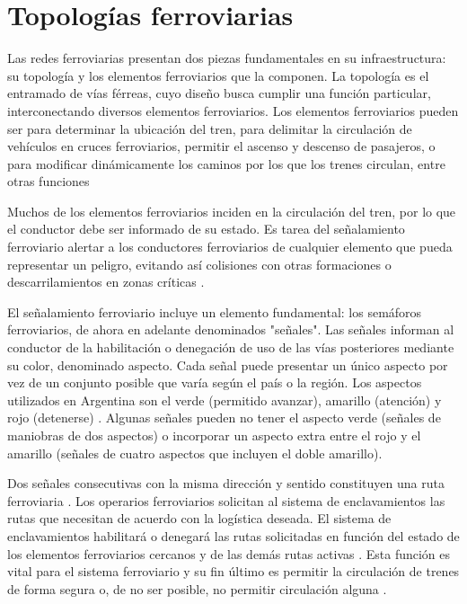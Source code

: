 \section{Topologías ferroviarias}
    \label{sec:topologias}
    Las redes ferroviarias presentan dos piezas fundamentales en su infraestructura: su topología y los elementos ferroviarios que la componen. La topología es el entramado de vías férreas, cuyo diseño busca cumplir una función particular, interconectando diversos elementos ferroviarios. Los elementos ferroviarios pueden ser para determinar la ubicación del tren, para delimitar la circulación de vehículos en cruces ferroviarios, permitir el ascenso y descenso de pasajeros, o para modificar dinámicamente los caminos por los que los trenes circulan, entre otras funciones \cite{Paper_4,Paper_13,Paper_17,Paper_175}

    Muchos de los elementos ferroviarios inciden en la circulación del tren, por lo que el conductor debe ser informado de su estado. Es tarea del señalamiento ferroviario alertar a los conductores ferroviarios de cualquier elemento que pueda representar un peligro, evitando así colisiones con otras formaciones o descarrilamientos en zonas críticas \cite{Paper_168,Paper_176,Paper_202,Paper_203}. 
    
    El señalamiento ferroviario incluye un elemento fundamental: los semáforos ferroviarios, de ahora en adelante denominados "señales". Las señales informan al conductor de la habilitación o denegación de uso de las vías posteriores mediante su color, denominado aspecto. Cada señal puede presentar un único aspecto por vez de un conjunto posible que varía según el país o la región. Los aspectos utilizados en Argentina son el verde (permitido avanzar), amarillo (atención) y rojo (detenerse) \cite{RITO}. Algunas señales pueden no tener el aspecto verde (señales de maniobras de dos aspectos) o incorporar un aspecto extra entre el rojo y el amarillo (señales de cuatro aspectos que incluyen el doble amarillo).
    
    Dos señales consecutivas con la misma dirección y sentido constituyen una ruta ferroviaria \cite{RITO,INTERLOCKING_BASIC,IRSE}. Los operarios ferroviarios solicitan al sistema de enclavamientos las rutas que necesitan de acuerdo con la logística deseada. El sistema de enclavamientos habilitará o denegará las rutas solicitadas en función del estado de los elementos ferroviarios cercanos y de las demás rutas activas . Esta función es vital para el sistema ferroviario y su fin último es permitir la circulación de trenes de forma segura o, de no ser posible, no permitir circulación alguna \cite{Paper_175,Paper_176,INTERLOCKING_BASIC,IRSE}.

    
    
    
    